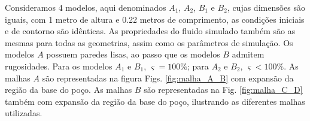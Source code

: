 Consideramos 4 modelos, aqui denominados $A_1$, $A_2$, $B_1$ e $B_2$, cujas dimensões são iguais, com 1 metro de altura e 0.22 metros de comprimento, as condições iniciais e de contorno são idênticas. As propriedades do fluido simulado também são as mesmas para todas as geometrias, assim como os parâmetros de simulação. Os modelos $A$ possuem paredes lisas, ao passo que os modelos $B$ admitem rugosidades. Para os modelos $A_1$ e $B_1$, $\varsigma = 100\%$; 
para $A_2$ e $B_2$, $\varsigma < 100\%$. As malhas $A$ são representadas na figura Figs. \ref{fig:malha_A_B} com expansão da região da base do poço. As malhas $B$ são representadas na Fig.
\ref{fig:malha_C_D} também com expansão da região da base do poço, ilustrando as diferentes malhas utilizadas.
\begin{figure}[H]
	\centering
	\begin{subfigure}[b]{0.1\linewidth}

\end{subfigure}
\end{figure}
